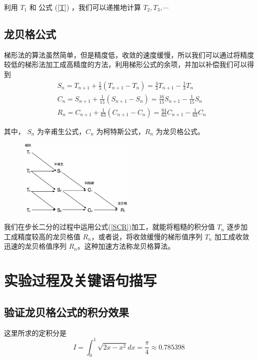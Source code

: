 \documentclass[lang=cn,11pt,a4paper]{elegantpaper}
\begin{document}
利用 $T_1$ 和 公式 (\ref{T}) ，我们可以递推地计算 $T_2, T_3, \cdots$

\subsection{龙贝格公式}
梯形法的算法虽然简单，但是精度低，收敛的速度缓慢，所以我们可以通过将精度较低的梯形法加工成高精度的方法，利用梯形公式的余项，并加以补偿我们可以得到
\begin{equation} \label{SCR}
  \begin{aligned}
    &S_n = T_{n+1} + \frac{1}{3}(T_{n+1} - T_n)
         = \frac{4}{3}T_{n+1} - \frac{1}{3}T_n \\
    &C_n = S_{n+1} + \frac{1}{15}(S_{n+1} - S_n)
         = \frac{16}{15}S_{n+1} - \frac{1}{15}S_n \\
    &R_n = C_{n+1} + \frac{1}{63}(C_{n+1} - C_n)
         = \frac{64}{63}C_{n+1} - \frac{1}{63}C_n
  \end{aligned}
\end{equation}

其中， $S_n$ 为辛甫生公式，$C_n$ 为柯特斯公式，$R_n$ 为龙贝格公式。

\begin{figure}[htbp]
  \centering
  \includegraphics[width=0.5\textwidth]{image/TSCR.png}
\end{figure}

我们在步长二分的过程中运用公式(\ref{SCR})加工，就能将粗糙的积分值 $T_n$ 逐步加工成精度较高的龙贝格值 $R_n$，或者说，将收敛缓慢的梯形值序列 $T_n$ 加工成收敛迅速的龙贝格值序列 $R_n$。这种加速方法称龙贝格算法。

\section{实验过程及关键语句描写}
\subsection{验证龙贝格公式的积分效果}

这里所求的定积分是
$$
  I = \int_{0}^{1} \sqrt{2x - x^2}dx = \frac{\pi}{4} \approx 0.785398 
$$
\end{document}
